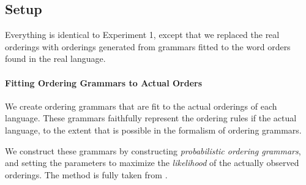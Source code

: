 \subsection{Setup}

Everything is identical to Experiment 1, except that we replaced the real orderings with orderings generated from grammars fitted to the word orders found in the real language.

\paragraph{Fitting Ordering Grammars to Actual Orders}
We create ordering grammars that are fit to the actual orderings of each language.
These grammars faithfully represent the ordering rules if the actual language, to the extent that is possible in the formalism of ordering grammars.

We construct these grammars by constructing \emph{probabilistic ordering grammars}, and setting the parameters to maximize the \emph{likelihood} of the actually observed orderings.
The method is fully taken from \cite{hahn-universals-2020}.


